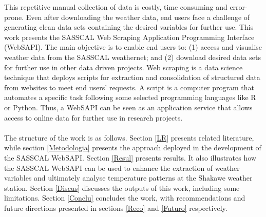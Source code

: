\documentclass[a4paper, 10pt, conference]{ieeeconf}      %
\begin{document}
\noindent  
   	 This repetitive manual collection of data is costly, time consuming and error-prone. %
   	 Even after downloading the weather data, end users face a challenge of generating clean data sets containing the desired variables for further use. %
%	
%	
   	 This work presents the SASSCAL Web Scraping Application Programming Interface (WebSAPI). The main objective is to enable end users to: (1) access and visualise weather data from the   SASSCAL weathernet; and (2) download desired data sets for further use in other data driven projects. Web scraping \cite{WebSrapping} is a data science technique that deploys scripts for extraction and consolidation of structured data from websites to meet end users' requests. A script is a computer program that automates a specific task following some selected programming languages like R or Python. Thus, a WebSAPI can be seen as an application service that allows access to online data for further use in research projects.
\\
\\
The structure of the work is as follows. Section \ref{LR} presents related literature, while section \ref{Metodologia} presents the   approach deployed in the development of the SASSCAL WebSAPI. %
   Section \ref{Resul} presents results. It also illustrates how the SASSCAL WebSAPI can be used to enhance the extraction of weather variables and ultimately analyse temperature patterns at the Shakawe weather station. %
Section \ref{Discus} discusses the outputs of this work, including some  limitations. Section \ref{Conclu} concludes the work, with  recommendations and future directions presented in sections \ref{Reco} and \ref{Futuro} respectively.
   
\end{document}
